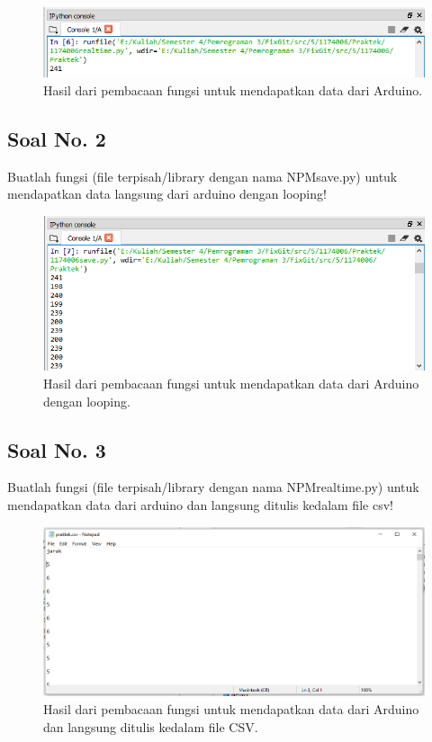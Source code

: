 \begin{figure}[H]
	\includegraphics[width=12cm]{figures/5/1174017/Praktek/1.png}
	\centering
	\caption{Hasil dari pembacaan fungsi untuk mendapatkan data dari Arduino.}
\end{figure}

\subsection{Soal No. 2}
Buatlah fungsi (file terpisah/library dengan nama NPMsave.py) untuk mendapatkan data langsung dari arduino dengan looping!


\begin{figure}[H]
	\includegraphics[width=12cm]{figures/5/1174017/Praktek/2.png}
	\centering
	\caption{Hasil dari pembacaan fungsi untuk mendapatkan data dari Arduino dengan looping.}
\end{figure}

\subsection{Soal No. 3}
Buatlah  fungsi  (file  terpisah/library  dengan  nama  NPMrealtime.py) untuk mendapatkan data dari arduino dan langsung ditulis kedalam file csv!


\begin{figure}[H]
	\includegraphics[width=12cm]{figures/5/1174017/Praktek/3.png}
	\centering
	\caption{Hasil dari pembacaan fungsi untuk mendapatkan data dari Arduino dan langsung ditulis kedalam file CSV.}
\end{figure}


